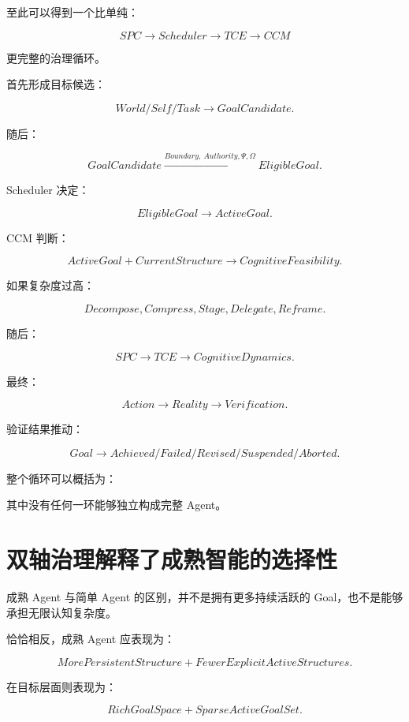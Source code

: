 至此可以得到一个比单纯：

\[
SPC
\rightarrow
Scheduler
\rightarrow
TCE
\rightarrow
CCM
\]

更完整的治理循环。

首先形成目标候选：

\[
World/Self/Task
\rightarrow
GoalCandidate.
\]

随后：

\[
GoalCandidate
\xrightarrow{
Boundary,\ Authority,\Psi,\Omega
}
EligibleGoal.
\]

Scheduler 决定：

\[
EligibleGoal
\rightarrow
ActiveGoal.
\]

CCM 判断：

\[
ActiveGoal
+
CurrentStructure
\rightarrow
CognitiveFeasibility.
\]

如果复杂度过高：

\[
Decompose,
Compress,
Stage,
Delegate,
Reframe.
\]

随后：

\[
SPC
\rightarrow
TCE
\rightarrow
CognitiveDynamics.
\]

最终：

\[
Action
\rightarrow
Reality
\rightarrow
Verification.
\]

验证结果推动：

\[
Goal
\rightarrow
Achieved/Failed/Revised/Suspended/Aborted.
\]

整个循环可以概括为：

\begin{statementbox}
\centering
{}
\end{statementbox}

其中没有任何一环能够独立构成完整 Agent。


\section{双轴治理解释了成熟智能的选择性}

成熟 Agent 与简单 Agent 的区别，并不是拥有更多持续活跃的 Goal，也不是能够承担无限认知复杂度。

恰恰相反，成熟 Agent 应表现为：

\[
\boxed{
MorePersistentStructure
+
FewerExplicitActiveStructures.
}
\]

在目标层面则表现为：

\[
\boxed{
RichGoalSpace
+
SparseActiveGoalSet.
}
\]

